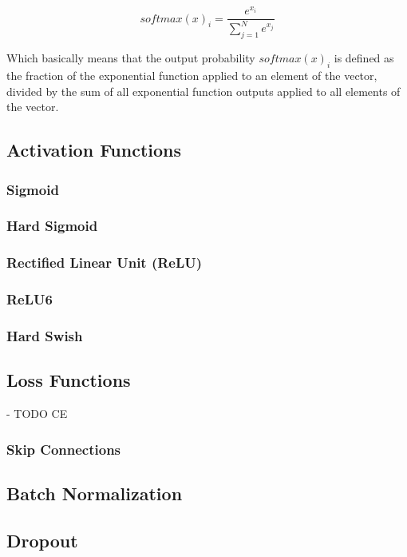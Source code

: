 \begin{equation}
    softmax(x)_i = \frac{e^{x_i}}{\sum_{j=1}^Ne^{x_j}}
\end{equation}

Which basically means that the output probability $softmax(x)_i$ is defined as the fraction of the exponential function applied to an element of the vector, divided by the sum of all exponential function outputs applied to all elements of the vector.

\subsection{Activation Functions}

\subsubsection{Sigmoid}

\subsubsection{Hard Sigmoid}

\subsubsection{Rectified Linear Unit (ReLU)}

\subsubsection{ReLU6}

\subsubsection{Hard Swish}

\subsection{Loss Functions}

- TODO CE

\subsubsection{Skip Connections}

\subsection{Batch Normalization}

\subsection{Dropout}
